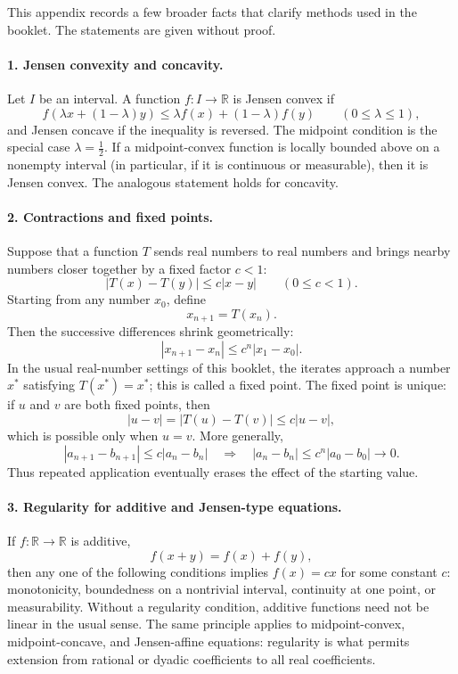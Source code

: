 \documentclass[12pt,a4paper]{article}
\begin{document}
This appendix records a few broader facts that clarify methods used in the
booklet. The statements are given without proof.

\paragraph{1. Jensen convexity and concavity.}
Let $I$ be an interval. A function $f:I\to\mathbb R$ is Jensen convex if
\[
f(\lambda x+(1-\lambda)y)
\le \lambda f(x)+(1-\lambda)f(y)
\qquad(0\le\lambda\le1),
\]
and Jensen concave if the inequality is reversed. The midpoint condition is
the special case $\lambda=\tfrac12$. If a midpoint-convex function is locally
bounded above on a nonempty interval (in particular, if it is continuous or
measurable), then it is Jensen convex. The analogous statement holds for
concavity.

\paragraph{2. Contractions and fixed points.}
Suppose that a function $T$ sends real numbers to real numbers and brings
nearby numbers closer together by a fixed factor $c<1$:
\[
|T(x)-T(y)|\le c|x-y|\qquad(0\le c<1).
\]
Starting from any number $x_0$, define
\[
x_{n+1}=T(x_n).
\]
Then the successive differences shrink geometrically:
\[
|x_{n+1}-x_n|\le c^n|x_1-x_0|.
\]
In the usual real-number settings of this booklet, the iterates approach a
number $x^*$ satisfying $T(x^*)=x^*$; this is called a fixed point. The fixed
point is unique: if $u$ and $v$ are both fixed points, then
\[
|u-v|=|T(u)-T(v)|\le c|u-v|,
\]
which is possible only when $u=v$. More generally,
\[
|a_{n+1}-b_{n+1}|\le c|a_n-b_n|
\quad\Longrightarrow\quad
|a_n-b_n|\le c^n|a_0-b_0|\to0.
\]
Thus repeated application eventually erases the effect of the starting value.

\paragraph{3. Regularity for additive and Jensen-type equations.}
If $f:\mathbb R\to\mathbb R$ is additive,
\[
f(x+y)=f(x)+f(y),
\]
then any one of the following conditions implies $f(x)=cx$ for some constant
$c$: monotonicity, boundedness on a nontrivial interval, continuity at one
point, or measurability. Without a regularity condition, additive functions
need not be linear in the usual sense. The same principle applies to
midpoint-convex, midpoint-concave, and Jensen-affine equations: regularity is
what permits extension from rational or dyadic coefficients to all real
coefficients.
\end{document}
